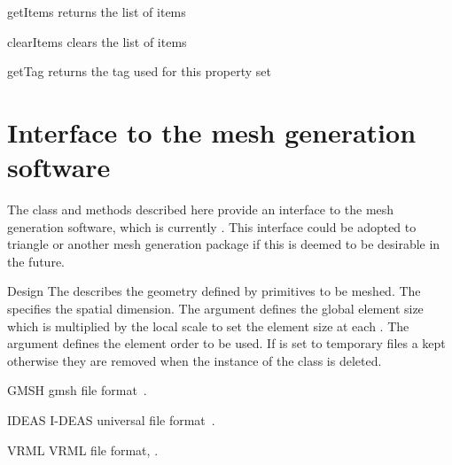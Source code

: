 \begin{methoddesc}[PropertySet]{getItems}{}
returns the list of items
\end{methoddesc}

\begin{methoddesc}[PropertySet]{clearItems}{}
clears the list of items
\end{methoddesc}

\begin{methoddesc}[PropertySet]{getTag}{}
returns the tag used for this property set
\end{methoddesc}

\section{Interface to the mesh generation software}

The class and methods described here provide an interface to the mesh
generation software, which is currently \gmshextern.  This interface could be
adopted to triangle or another mesh generation package if this is
deemed to be desirable in the future.

\begin{classdesc}{Design}{
}
The  describes the geometry defined by primitives to be meshed.
The  specifies the spatial dimension. The argument  defines the global
element size which is multiplied by the local scale to set the element size at each \Point.
The argument  defines the element order to be used. If  is set to
\True temporary files a kept otherwise they are removed when the instance of the class is deleted.
\end{classdesc}


\begin{memberdesc}[Design]{GMSH}
gmsh file format~\cite{GMSH}.
\end{memberdesc}

\begin{memberdesc}[Design]{IDEAS}
I-DEAS universal file format~\cite{IDEAS}.
\end{memberdesc}

\begin{memberdesc}[Design]{VRML}
VRML file format, \cite{VRML}.
\end{memberdesc}


